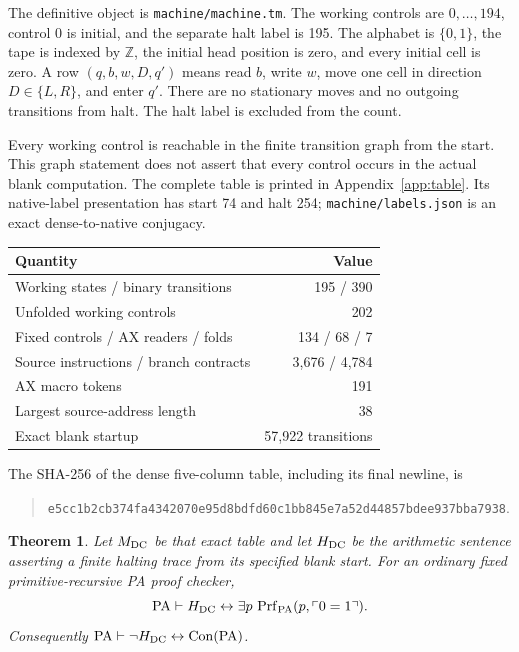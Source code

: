 \documentclass[11pt,letterpaper]{article}
\newtheorem{theorem}{Theorem}[section]
\newcommand{\PA}{\mathrm{PA}}
\newcommand{\Con}{\operatorname{Con}}
\newcommand{\file}[1]{\texttt{\nolinkurl{#1}}}
\begin{document}
The definitive object is \file{machine/machine.tm}. The working controls are
$0,\ldots,194$, control 0 is initial, and the separate halt label is 195.
The alphabet is $\{0,1\}$, the tape is indexed by $\mathbb Z$, the initial
head position is zero, and every initial cell is zero. A row
$(q,b,w,D,q')$ means read $b$, write $w$, move one cell in direction
$D\in\{L,R\}$, and enter $q'$. There are no stationary moves and no
outgoing transitions from halt. The halt label is excluded from the count.

Every working control is reachable in the finite transition graph from the
start. This graph statement does not assert that every control occurs in
the actual blank computation. The complete table is printed in
Appendix~\ref{app:table}. Its native-label presentation has start 74 and
halt 254; \file{machine/labels.json} is an exact dense-to-native conjugacy.

\begin{center}
\begin{tabular}{@{}lr@{}}
\toprule
Quantity&Value\\\midrule
Working states / binary transitions&195 / 390\\
Unfolded working controls&202\\
Fixed controls / AX readers / folds&134 / 68 / 7\\
Source instructions / branch contracts&3,676 / 4,784\\
AX macro tokens&191\\
Largest source-address length&38\\
Exact blank startup&57,922 transitions\\
\bottomrule
\end{tabular}
\end{center}
The SHA-256 of the dense five-column table, including its final newline, is
\begin{quote}\small
\nolinkurl{e5cc1b2cb374fa4342070e95d8bdfd60c1bb845e7a52d44857bdee937bba7938}.
\end{quote}

\begin{theorem}\label{thm:main}
Let $M_{\rm DC}$ be that exact table and let $H_{\rm DC}$ be the arithmetic
sentence asserting a finite halting trace from its specified blank start.
For an ordinary fixed primitive-recursive PA proof checker,
\[
 \PA\vdash H_{\rm DC}\leftrightarrow
      \exists p\,\operatorname{Prf}_{\PA}(p,\ulcorner0=1\urcorner).
\]
Consequently $\PA\vdash\neg H_{\rm DC}\leftrightarrow\Con(\PA)$.
\end{theorem}
\end{document}
